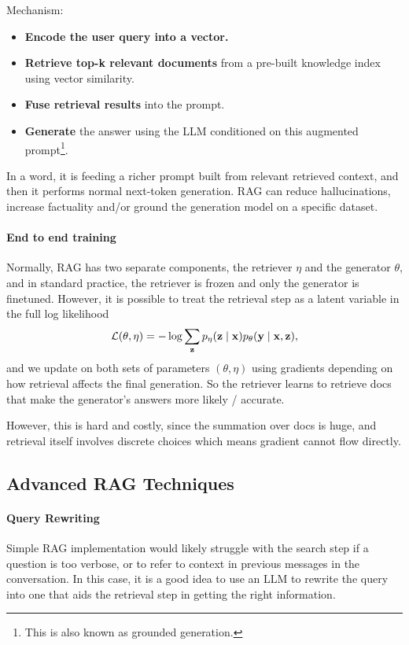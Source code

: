 \documentclass[11pt]{article}  %
\begin{document}
Mechanism:
\begin{itemize}
  \item \textbf{Encode the user query into a vector.}
  \item \textbf{Retrieve top-k relevant documents} from a pre-built knowledge index using vector similarity. 
  \item \textbf{Fuse retrieval results} into the prompt.
  \item \textbf{Generate} the answer using the LLM conditioned on this augmented prompt\footnote{This is also known as grounded generation.}.
\end{itemize}
In a word, it is feeding a richer prompt built from relevant retrieved context, and then it performs normal next-token generation.
RAG can reduce hallucinations, increase factuality and/or ground the generation model on a specific dataset.

\paragraph{End to end training}
Normally, RAG has two separate components, the retriever $\eta$ and the generator $\theta$, and in standard practice, the retriever is frozen and only the generator is finetuned.
However, it is possible to treat the retrieval step as a latent variable in the full log likelihood
\begin{align*}
  \mathcal{L}(\theta, \eta) = - \log\sum_{\mathbf{z}} p_{\eta}(\mathbf{z} \mid \mathbf{x}) p_{\theta}(\mathbf{y} \mid \mathbf{x}, \mathbf{z}),
\end{align*}
and we update on both sets of parameters $(\theta, \eta)$ using gradients depending on how retrieval affects the final generation.
So the retriever learns to retrieve docs that make the generator's answers more likely / accurate.

However, this is hard and costly, since the summation over docs is huge, and retrieval itself involves discrete choices which means gradient cannot flow directly.

\subsection{Advanced RAG Techniques}

\paragraph{Query Rewriting}
Simple RAG implementation would likely struggle with the search step if a question is too verbose, or to refer to context in previous messages in the conversation. 
In this case, it is a good idea to use an LLM to rewrite the query into one that aids the retrieval step in getting the right information.
\end{document}
